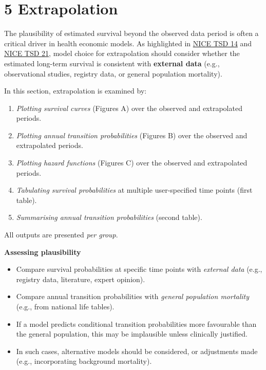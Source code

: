 \documentclass[
]{article}
\providecommand{\tightlist}{%
  \setlength{\itemsep}{0pt}\setlength{\parskip}{0pt}}
\begin{document}
\clearpage

\clearpage

\section{5 Extrapolation}\label{extrapolation}

The plausibility of estimated survival beyond the observed data period
is often a critical driver in health economic models. As highlighted in
\href{https://nicedsu.org.uk/wp-content/uploads/2016/03/NICE-DSU-TSD-Survival-analysis.updated-March-2013.v2.pdf}{NICE
TSD 14} and \href{https://www.sheffield.ac.uk/media/34188/download}{NICE
TSD 21}, model choice for extrapolation should consider whether the
estimated long-term survival is consistent with \textbf{external data}
(e.g., observational studies, registry data, or general population
mortality).

In this section, extrapolation is examined by:

\begin{enumerate}
\def\labelenumi{\arabic{enumi}.}
\tightlist
\item
  \emph{Plotting survival curves} (Figures A) over the observed and
  extrapolated periods.\\
\item
  \emph{Plotting annual transition probabilities} (Figures B) over the
  observed and extrapolated periods.
\item
  \emph{Plotting hazard functions} (Figures C) over the observed and
  extrapolated periods.
\item
  \emph{Tabulating survival probabilities} at multiple user-specified
  time points (first table).
\item
  \emph{Summarising annual transition probabilities} (second table).
\end{enumerate}

All outputs are presented \emph{per group}.

\textbf{Assessing plausibility}

\begin{itemize}
\tightlist
\item
  Compare survival probabilities at specific time points with
  \emph{external data} (e.g., registry data, literature, expert
  opinion).\\
\item
  Compare annual transition probabilities with \emph{general population
  mortality} (e.g., from national life tables).\\
\item
  If a model predicts conditional transition probabilities more
  favourable than the general population, this may be implausible unless
  clinically justified.\\
\item
  In such cases, alternative models should be considered, or adjustments
  made (e.g., incorporating background mortality).
\end{itemize}
\end{document}
